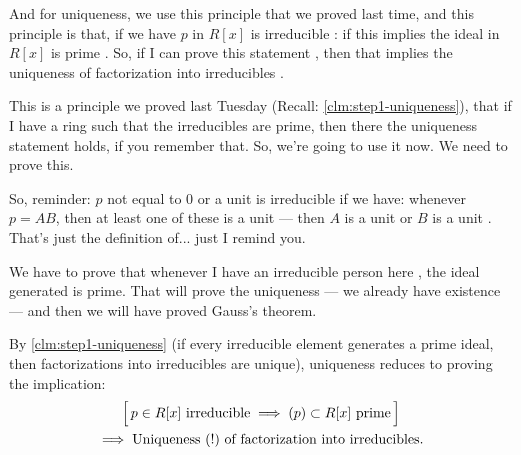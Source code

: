 \begin{speech}[00:12:13 - 00:13:52]
And for uniqueness, we use this principle that we proved last time, and this principle is that, if we have $p$ in $R[x]$ is irreducible : if this implies the ideal in $R[x]$ is prime . So, if I can prove this statement , then that implies the uniqueness of factorization into irreducibles .

This is a principle we proved last Tuesday (Recall: \cref{clm:step1-uniqueness}), that if I have a ring such that the irreducibles are prime, then there the uniqueness statement holds, if you remember that. So, we're going to use it now. We need to prove this.

So, reminder: $p$ not equal to $0$ or a unit is irreducible if we have: whenever $p = AB$, then at least one of these is a unit --- then $A$ is a unit or $B$ is a unit . That's just the definition of... just I remind you.

We have to prove that whenever I have an irreducible person here , the ideal generated is prime. That will prove the uniqueness --- we already have existence --- and then we will have proved Gauss's theorem.
\end{speech}

\begin{content}

By \cref{clm:step1-uniqueness} (if every irreducible element generates a prime ideal, then factorizations into irreducibles are unique), uniqueness reduces to proving the implication:
\begin{multline*}
\Bigl[\, p \in R[x] \text{ irreducible} \implies (p) \subset R[x] \text{ prime} \,\Bigr] \\
\implies \text{Uniqueness ($!$) of factorization into irreducibles.}
\end{multline*}
\end{content}

